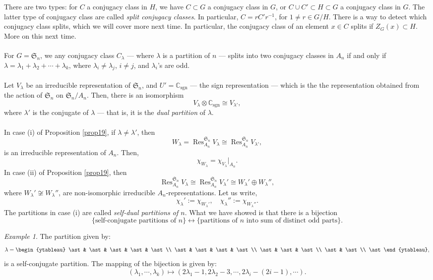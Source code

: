 \documentclass[a4paper]{report}
\theoremstyle{definition}
\theoremstyle{remark}
\theoremstyle{proposition}
\theoremstyle{conjecture}
\theoremstyle{lemma}
\theoremstyle{corollary}
\theoremstyle{exercise}
\theoremstyle{example}
\newtheorem{example}{Example}
\newcommand{\C}{\mathbb{C}}
\newcommand{\on}{\operatorname}
\begin{document}
There are two types: for $C$ a conjugacy class in $H$, we have 
$C\subset G$ a conjugacy class in $G$, 
or $C\cup C' \subset H \subset G$ a conjugacy class in $G$.
The latter type of conjugacy class are called \emph{split conjugacy 
classes}.
In particular, $C = rC'r^{-1}$, for $1\neq r \in G/H$.
There is a way to detect which conjugacy class splits, which we will cover 
more next time. In particular, the conjugacy class of an element 
$x\in C$ splits if $Z_G(x) \subset H$. More on this next time.\\\\
For $G = \mathfrak{S}_n$, we any conjugacy class $C_\lambda$ ---
where $\lambda$ is a partition of $n$ --- splits into two conjugacy
classes in $A_n$ if and only if 
$\lambda = \lambda_1+\lambda_2 + \cdots + \lambda_k$, where 
$\lambda_i\neq \lambda_j$, $i\neq j$, and $\lambda_i$'s are odd.\\\\
Let $V_\lambda$ be an irreducible representation of $\mathfrak{S}_n$,
and $U' = \C_{\on{sgn}}$ --- the sign representation --- which is the 
the representation obtained from the action of $\mathfrak{S}_n$
on $\mathfrak{S}_n/A_n$.
Then, there is an isomorphism $$V_\lambda \otimes \C_{\on{sgn}} \cong V_{\lambda'},$$
where $\lambda'$ is the conjugate of $\lambda$ --- that is, it is the 
\emph{dual partition} of $\lambda$.\\\\
In case (i) of Proposition \ref{prop19}, if $\lambda\neq\lambda'$,
then 
$$W_\lambda = \on{Res}_{A_n}^{\mathfrak{S}_n}V_\lambda \cong \on{Res}_{A_n}^{\mathfrak{S}_n}V_{\lambda'},$$
is an irreducible representation of $A_n$.
Then, 
$$\chi_{W_\lambda} = \chi_{V_\lambda}\vert_{A_n}.$$
In case (ii) of Proposition \ref{prop19}, then 
$$\on{Res}_{A_n}^{\mathfrak{S}_n}V_\lambda \cong \on{Res}_{A_n}^{\mathfrak{S}_n}V_{\lambda}' \cong W_{\lambda}'\oplus W_\lambda'',$$
where $W_\lambda'\not\cong W_\lambda''$, are non-isomorphic irreducible
$A_n$-representations. Let us write,
$$\chi_\lambda' := \chi_{W_\lambda'}, \quad \chi_\lambda'' := \chi_{W_\lambda''}.$$
The partitions in case (i) are called \emph{self-dual partitions of $n$}.
What we have showed is that there is a bijection
\begin{equation}\label{eqn_self_conj_part}
    \lbrace \text{self-conjugate partitions of $n$}\rbrace \longleftrightarrow \lbrace \text{partitions of $n$ into sum of distinct odd parts}\rbrace.
\end{equation}
\begin{example}
    The partition given by:
    $$\lambda = \begin{ytableau}
        \ast & \ast & \ast & \ast & \ast\\
        \ast & \ast & \ast & \ast\\
        \ast & \ast & \ast\\
        \ast & \ast\\
        \ast
    \end{ytableau},$$
    is a self-conjugate partition.
    The mapping of the bijection is given by: 
    $$(\lambda_1,\cdots,\lambda_k) \longmapsto (2\lambda_1-1,2\lambda_2-3,\cdots,2\lambda_i-(2i-1),\cdots).$$
\end{example}
\end{document}
